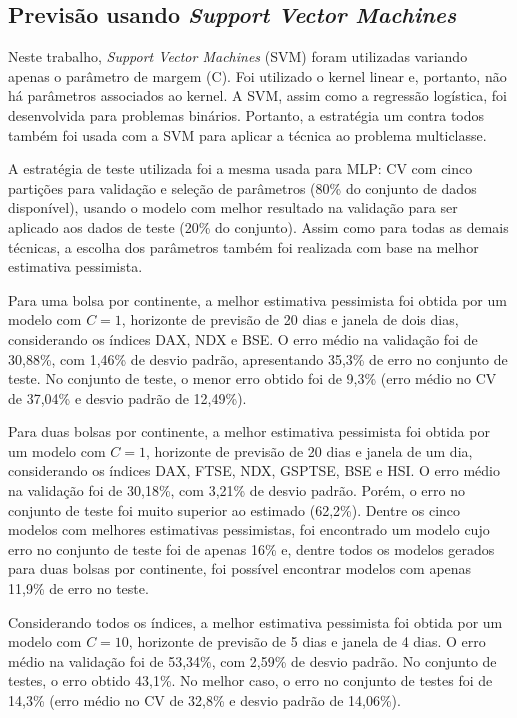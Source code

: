 \documentclass[12pt,a4paper,utf8]{ppgsi}
\begin{document}
    \subsection{Previsão usando \textit{Support Vector Machines}}

        Neste trabalho, \textit{Support Vector Machines} (SVM) foram utilizadas variando apenas o parâmetro de margem (C). Foi utilizado o kernel linear e, portanto, não há parâmetros associados ao kernel. A SVM, assim como a regressão logística, foi desenvolvida para problemas binários. Portanto, a estratégia um contra todos também foi usada com a SVM para aplicar a técnica ao problema multiclasse.

        A estratégia de teste utilizada foi a mesma usada para MLP: CV com cinco partições para validação e seleção de parâmetros (80\% do conjunto de dados disponível), usando o modelo com melhor resultado na validação para ser aplicado aos dados de teste (20\% do conjunto). Assim como para todas as demais técnicas, a escolha dos parâmetros também foi realizada com base na melhor estimativa pessimista.

        Para uma bolsa por continente, a melhor estimativa pessimista foi obtida por um modelo com $C=1$, horizonte de previsão de 20 dias e janela de dois dias, considerando os índices DAX, NDX e BSE. O erro médio na validação foi de 30,88\%, com 1,46\% de desvio padrão, apresentando 35,3\% de erro no conjunto de teste. No conjunto de teste, o menor erro obtido foi de 9,3\% (erro médio no CV de 37,04\% e desvio padrão de 12,49\%).

        Para duas bolsas por continente, a melhor estimativa pessimista foi obtida por um modelo com $C=1$, horizonte de previsão de 20 dias e janela de um dia, considerando os índices DAX, FTSE, NDX, GSPTSE, BSE e HSI. O erro médio na validação foi de 30,18\%, com 3,21\% de desvio padrão. Porém, o erro no conjunto de teste foi muito superior ao estimado (62,2\%). Dentre os cinco modelos com melhores estimativas pessimistas, foi encontrado um modelo cujo erro no conjunto de teste foi de apenas 16\% e, dentre todos os modelos gerados para duas bolsas por continente, foi possível encontrar modelos com apenas 11,9\% de erro no teste.

        Considerando todos os índices, a melhor estimativa pessimista foi obtida por um modelo com $C=10$, horizonte de previsão de 5 dias e janela de 4 dias. O erro médio na validação foi de 53,34\%, com 2,59\% de desvio padrão. No conjunto de testes, o erro obtido 43,1\%. No melhor caso, o erro no conjunto de testes foi de 14,3\% (erro médio no CV de 32,8\% e desvio padrão de 14,06\%).
\end{document}
